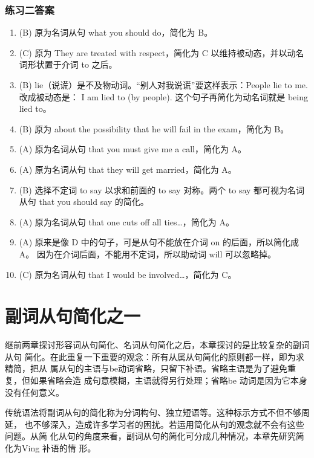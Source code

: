 \subsection{练习二答案}
\begin{enumerate}
\item (B) 原为名词从句 what you should do，简化为 B。

\item (C) 原为 They are treated with respect，简化为 C 以维持被动态，并以动名词形状置于介词 to 之后。
\item (B) lie（说谎）是不及物动词。“别人对我说谎”要这样表示：People lie to me. 改成被动态是： I am lied to (by people). 这个句子再简化为动名词就是 being lied to。

\item (B) 原为 about the possibility that he will fail in the exam，简化为 B。

\item (A) 原为名词从句 that you must give me a call，简化为 A。

\item (A) 原为名词从句 that they will get married，简化为 A。

\item (B) 选择不定词 to say 以求和前面的 to say 对称。两个 to say 都可视为名词从句 that you should say 的简化。

\item (A) 原为名词从句 that one cuts off all ties…，简化为 A。

\item (A) 原来是像 D 中的句子，可是从句不能放在介词 on 的后面，所以简化成 A。
  因为在介词后面，不能用不定词，所以助动词 will 可以忽略掉。

\item (C) 原为名词从句 that I would be involved…，简化为 C。
\end{enumerate}

\chapter{副词从句简化之一}

继前两章探讨形容词从句简化、名词从句简化之后，本章探讨的是比较复杂的副词从句
简化。在此重复一下重要的观念：所有从属从句简化的原则都一样，即为求精简，把从
属从句的主语与be动词省略，只留下补语。省略主语是为了避免重复，但如果省略会造
成句意模糊，主语就得另行处理；省略be 动词是因为它本身没有任何意义。

传统语法将副词从句的简化称为分词构句、独立短语等。这种标示方式不但不够周延，
也不够深入，造成许多学习者的困扰。若运用简化从句的观念就不会有这些问题。从简
化从句的角度来看，副词从句的简化可分成几种情况，本章先研究简化为Ving 补语的情
形。

